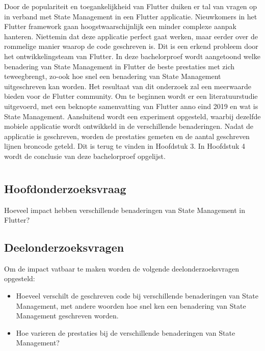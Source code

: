 Door de populariteit en toegankelijkheid van Flutter duiken er tal van vragen op in verband met State Management in een Flutter applicatie. Nieuwkomers in het Flutter framework gaan hoogstwaarschijnlijk een minder complexe aanpak hanteren. Niettemin dat deze applicatie perfect gaat werken, maar eerder over de rommelige manier waarop de code geschreven is. Dit is een erkend probleem door het ontwikkelingsteam van Flutter.
\newline
In deze bachelorproef wordt aangetoond welke benadering van State Management in Flutter de beste prestaties met zich teweegbrengt, zo-ook hoe snel een benadering van State Management uitgeschreven kan worden. Het resultaat van dit onderzoek zal een meerwaarde bieden voor de Flutter community. Om te beginnen wordt er een literatuurstudie uitgevoerd, met een beknopte samenvatting van Flutter anno eind 2019 en wat is State Management. Aansluitend wordt een experiment opgesteld, waarbij dezelfde mobiele applicatie wordt ontwikkeld in de verschillende benaderingen. Nadat de applicatie is geschreven, worden de prestaties gemeten en de aantal geschreven lijnen broncode geteld. Dit is terug te vinden in Hoofdstuk 3.
\newline
In Hoofdstuk 4 wordt de conclusie van deze bachelorproef opgelijst.

\section{}
\label{sec:onderzoeksvraag}

\subsection{Hoofdonderzoeksvraag}
Hoeveel impact hebben verschillende benaderingen van State Management in Flutter?

\subsection{Deelonderzoeksvragen}
Om de impact vatbaar te maken worden de volgende deelonderzoeksvragen opgesteld:
\begin{itemize}
    \item Hoeveel verschilt de geschreven code bij verschillende benaderingen van State Management, met andere woorden
    hoe snel ken een benadering van State Management geschreven worden.
    \item{Hoe varieren de prestaties bij de verschillende benaderingen van State Management?}
\end{itemize}

